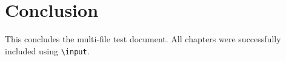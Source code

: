 \section{Conclusion}
This concludes the multi-file test document.
All chapters were successfully included using \texttt{{\textbackslash}input}.
